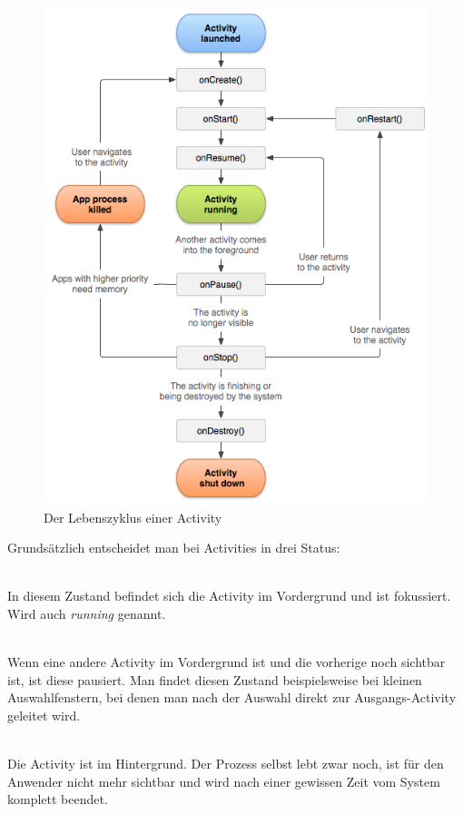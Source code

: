 \begin{figure}[ht!]
\begin{center}
\includegraphics[scale=.6]{images/activity_lifecycle}
\caption{Der Lebenszyklus einer Activity}
\label{lifecycle}
\end{center}
\end{figure}

Grundsätzlich entscheidet man bei Activities in drei Status:

\begin{description}[style=nextline]

	\item[Resumed] \hfill \\
	In diesem Zustand befindet sich die Activity im Vordergrund und ist fokussiert. Wird auch \emph{running} genannt.
	
	\item[Paused] \hfill \\
	Wenn eine andere Activity im Vordergrund ist und die vorherige noch sichtbar ist, ist diese pausiert. Man findet diesen Zustand beispielsweise bei kleinen Auswahlfenstern, bei denen man nach der Auswahl direkt  zur Ausgangs-Activity geleitet wird.
	
	\item[Stopped] \hfill \\
	Die Activity ist im Hintergrund. Der Prozess selbst lebt zwar noch, ist für den Anwender nicht mehr sichtbar und wird nach einer gewissen Zeit vom System komplett beendet.
	
\end{description}

